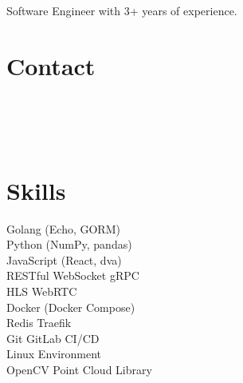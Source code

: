\documentclass[]{deedy-resume}
\begin{document}
%
%
\lastupdated

%
%
{Software Engineer with 3+ years of experience.}

%
%
\begin{minipage}[t]{0.32\textwidth} 

\section{Contact}
{\parskip3pt
\href{mailto:devcchsu@gmail.com}{}\vspace{3pt} \\
\href{https://www.linkedin.com/in/devcchsu}{}\vspace{3pt} \\
\href{https://github.com/wuchihsu}{}\vspace{3pt} \\
\href{https://goo.gl/maps/CGLqV6QWdAYszMuo9}{}
}
\sectionsep

\section{Skills}
\textbullet{} Golang (Echo, GORM)
\\\textbullet{} Python (NumPy, pandas)
\\\textbullet{} JavaScript (React, dva)
\\\textbullet{} RESTful \textbullet{} WebSocket \textbullet{} gRPC
\\\textbullet{} HLS \textbullet{} WebRTC
\\\textbullet{} Docker (Docker Compose)
\\\textbullet{} Redis \textbullet{} Traefik
\\\textbullet{} Git \textbullet{} GitLab CI/CD
\\\textbullet{} Linux Environment
\\\textbullet{} OpenCV \textbullet{} Point Cloud Library
\sectionsep


\end{minipage}
\end{document}
